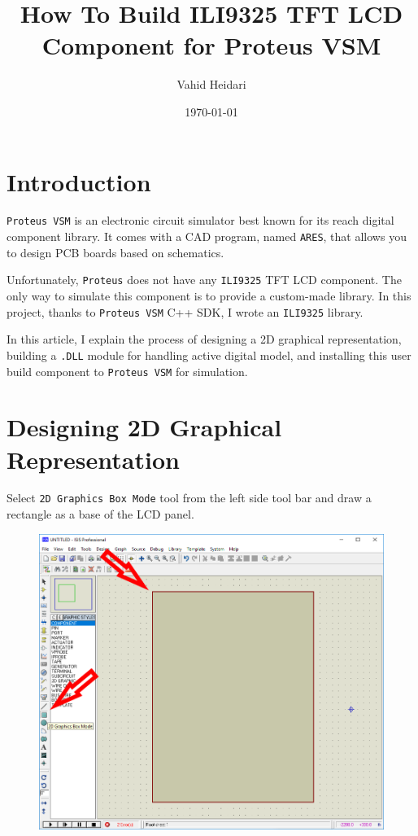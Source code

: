 \documentclass{article}
\def\imgscale{0.23}
\begin{document}
\title{How To Build ILI9325 TFT LCD Component for Proteus VSM}
\author{Vahid Heidari}
\date{\today}
\maketitle



\section{Introduction}

\texttt{Proteus VSM} is an electronic circuit simulator best known for its reach
digital component library. It comes with a CAD program, named \texttt{ARES},
that allows you to design PCB boards based on schematics.

Unfortunately, \texttt{Proteus} does not have any \texttt{ILI9325} TFT LCD
component. The only way to simulate this component is to provide a custom-made
library. In this project, thanks to \texttt{Proteus VSM} C++ SDK, I wrote an
\texttt{ILI9325} library.

In this article, I explain the process of designing a 2D graphical
representation, building a \texttt{.DLL} module for handling active digital
model, and installing this user build component to \texttt{Proteus VSM} for
simulation.



\section{Designing 2D Graphical Representation}

Select \texttt{2D Graphics Box Mode} tool from the left side tool bar and draw a
rectangle as a base of the LCD panel.
\begin{figure}[!ht]
\centering
\includegraphics [scale=\imgscale] {Images/01-base/0-2d-box.png}
\end{figure}
\end{document}
